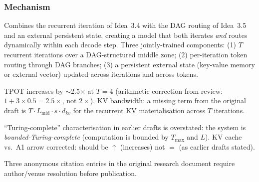 \documentclass[11pt]{article}
\begin{document}
\subsubsection*{Mechanism}
Combines the recurrent iteration of Idea~3.4 with the DAG routing of Idea~3.5 and an external persistent state, creating a model that both iterates \emph{and} routes dynamically within each decode step.
Three jointly-trained components: (1) $T$ recurrent iterations over a DAG-structured middle zone; (2) per-iteration token routing through DAG branches; (3) a persistent external state (key-value memory or external vector) updated across iterations and across tokens.

TPOT increases by $\sim$2.5$\times$ at $T=4$ (arithmetic correction from review: $1 + 3 \times 0.5 = 2.5\times$, not $2\times$).
KV bandwidth: a missing term from the original draft is $T \cdot L_\text{mid} \cdot s \cdot d_{kv}$ for the recurrent KV materialisation across $T$ iterations.

``Turing-complete'' characterisation in earlier drafts is overstated: the system is \emph{bounded-Turing-complete} (computation is bounded by $T_\text{max}$ and $L$).
KV cache vs.\ A1 arrow corrected: should be $\uparrow$ (increases) not $=$ (as earlier drafts stated).

Three anonymous citation entries in the original research document require author/venue resolution before publication.
\end{document}
